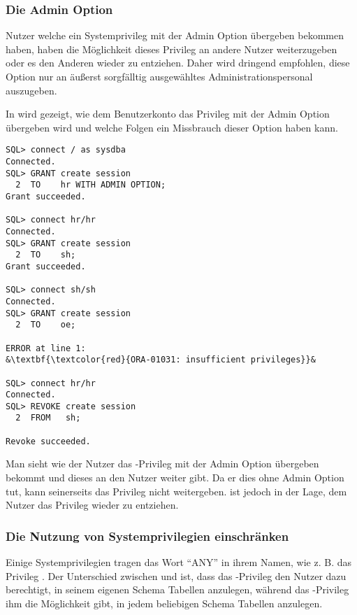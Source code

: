         \subsubsection{Die Admin Option}
          \begin{merke}
            Nutzer welche ein Systemprivileg mit der Admin Option übergeben
            bekommen haben, haben die Möglichkeit dieses Privileg an andere
            Nutzer weiterzugeben oder es den Anderen wieder zu entziehen. Daher
            wird dringend empfohlen, diese Option nur an äußerst sorgfälltig
            ausgewähltes Administrationspersonal auszugeben.
          \end{merke}
          In  wird gezeigt, wie dem Benutzerkonto
           das  Privileg mit der Admin
          Option übergeben wird und welche Folgen ein Missbrauch dieser Option
          haben kann.
          \begin{lstlisting}[caption={Zuweisen eines System Privileges mit ADMIN
          OPTION},label=admin230,language=oracle_sql,alsolanguage=sqlplus]
SQL> connect / as sysdba
Connected.
SQL> GRANT create session
  2  TO    hr WITH ADMIN OPTION;
Grant succeeded.

SQL> connect hr/hr
Connected.
SQL> GRANT create session
  2  TO    sh;
Grant succeeded.

SQL> connect sh/sh
Connected.
SQL> GRANT create session
  2  TO    oe;

ERROR at line 1:
&\textbf{\textcolor{red}{ORA-01031: insufficient privileges}}&

SQL> connect hr/hr
Connected.
SQL> REVOKE create session
  2  FROM   sh;

Revoke succeeded.
          \end{lstlisting}
          Man sieht wie der Nutzer  das -Privileg mit der Admin Option übergeben bekommt und dieses
          an den Nutzer  weiter gibt. Da er dies ohne Admin
          Option tut, kann  seinerseits das Privileg nicht
          weitergeben.  ist jedoch in der Lage, dem Nutzer
           das Privileg wieder zu entziehen.
        \subsubsection{Die Nutzung von Systemprivilegien einschränken}
          Einige Systemprivilegien tragen das Wort \enquote{ANY} in ihrem Namen,
          wie z. B. das Privileg . Der Unterschied
          zwischen  und  ist,
          dass das -Privileg den Nutzer dazu berechtigt,
          in seinem eigenen Schema Tabellen anzulegen, während das
          -Privileg ihm die Möglichkeit gibt, in
          jedem beliebigen Schema Tabellen anzulegen.

